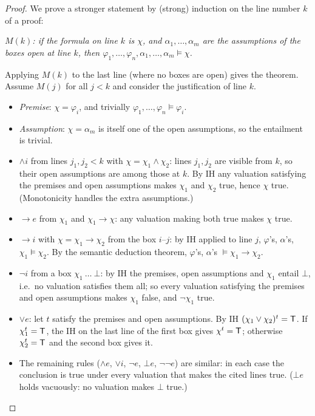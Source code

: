\begin{proof}
We prove a stronger statement by (strong) induction on the line number $k$ of a proof:

\emph{$M(k)$: if the formula on line $k$ is $\chi$, and $\alpha_1,\dots,\alpha_m$ are the
assumptions of the boxes open at line $k$, then
$\varphi_1,\dots,\varphi_n,\alpha_1,\dots,\alpha_m\models\chi$.}

Applying $M(k)$ to the last line (where no boxes are open) gives the theorem. Assume
$M(j)$ for all $j<k$ and consider the justification of line $k$.
\begin{itemize}
  \item \emph{Premise}: $\chi=\varphi_i$, and trivially $\varphi_1,\dots,\varphi_n\models\varphi_i$.
  \item \emph{Assumption}: $\chi=\alpha_m$ is itself one of the open assumptions, so the
        entailment is trivial.
  \item \emph{$\land i$} from lines $j_1,j_2<k$ with $\chi=\chi_1\land\chi_2$: lines $j_1,j_2$
        are visible from $k$, so their open assumptions are among those at $k$. By IH any
        valuation satisfying the premises and open assumptions makes $\chi_1$ and
        $\chi_2$ true, hence $\chi$ true. (Monotonicity handles the extra assumptions.)
  \item \emph{$\to e$} from $\chi_1$ and $\chi_1\to\chi$: any valuation making both true
        makes $\chi$ true.
  \item \emph{$\to i$} with $\chi=\chi_1\to\chi_2$ from the box $i$--$j$: by IH applied to
        line $j$, $\varphi$'s, $\alpha$'s, $\chi_1\models\chi_2$. By the semantic
        deduction theorem, $\varphi$'s, $\alpha$'s $\models\chi_1\to\chi_2$.
  \item \emph{$\neg i$} from a box $\chi_1\ \dots\ \bot$: by IH the premises, open
        assumptions and $\chi_1$ entail $\bot$, i.e.\ no valuation satisfies them all; so
        every valuation satisfying the premises and open assumptions makes $\chi_1$ false,
        and $\neg\chi_1$ true.
  \item \emph{$\lor e$}: let $t$ satisfy the premises and open assumptions. By IH
        $(\chi_1\lor\chi_2)^t=\mathsf{T}$. If $\chi_1^t=\mathsf{T}$, the IH on the last line of the first
        box gives $\chi^t=\mathsf{T}$; otherwise $\chi_2^t=\mathsf{T}$ and the second box gives it.
  \item The remaining rules ($\land e$, $\lor i$, $\neg e$, $\bot e$, $\neg\neg e$) are
        similar: in each case the conclusion is true under every valuation that makes
        the cited lines true. ($\bot e$ holds vacuously: no valuation makes $\bot$ true.)
\end{itemize}
\end{proof}

